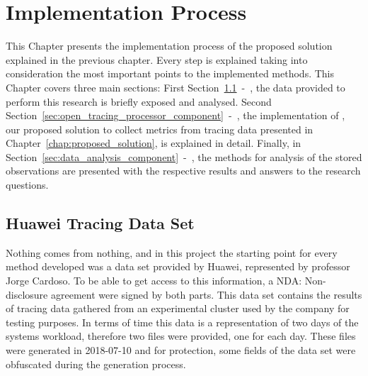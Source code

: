 \glsresetall
\chapter{Implementation Process}
\label{chap:implementation_process}

This Chapter presents the implementation process of the proposed solution explained in the previous chapter. Every step is explained taking into consideration the most important points to the implemented methods. This Chapter covers three main sections: First Section~\ref{sec:huawei_tracing_data_set}~-~, the data provided to perform this research is briefly exposed and analysed. Second Section~\ref{sec:open_tracing_processor_component}~-~, the implementation of , our proposed solution to collect metrics from tracing data presented in Chapter~\ref{chap:proposed_solution}, is explained in detail. Finally, in Section~\ref{sec:data_analysis_component}~-~, the methods for analysis of the stored observations are presented with the respective results and answers to the research questions.

\section{Huawei Tracing Data Set}
\label{sec:huawei_tracing_data_set}

Nothing comes from nothing, and in this project the starting point for every method developed was a data set provided by Huawei, represented by professor Jorge Cardoso. To be able to get access to this information, a NDA: Non-disclosure agreement were signed by both parts. This data set contains the results of tracing data gathered from an experimental cluster used by the company for testing purposes. In terms of time this data is a representation of two days of the systems workload, therefore two files were provided, one for each day. These files were generated in 2018-07-10 and for protection, some fields of the data set were obfuscated during the generation process.

